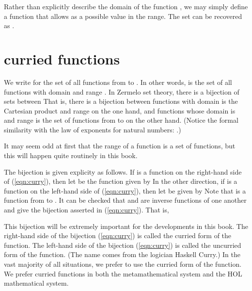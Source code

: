 \documentclass[cup9a]{cupbook}
\begin{document}
Rather than explicitly describe the domain of the function , we may simply
define a function  that allows  as a possible value in the range.  The set  can be recovered as
.







\section{curried functions}

We write  for the set of all functions from  to .  In other
words,  is the set of all functions with domain  and range .
In Zermelo set theory, there is a bijection of sets between
That is, there is a bijection between functions with domain is the Cartesian product  and range  on the one hand, and functions whose domain is  and range is the set of functions from  to  on the other hand.
(Notice the formal similarity with the law of exponents for natural numbers:
.)

It may seem odd at first that the range of a function is a set of functions, but this will happen quite routinely in this book.

The bijection is given explicity as follows.  If  is a function
on the right-hand side of (\ref{eqn:curry}), then let 
be the function given by 
In the other direction, if  is a function on the left-hand side of (\ref{eqn:curry}), then let  be given by
Note that  is a function from  to .
It can be  checked that  and  are inverse functions of one another and give the bijection asserted in (\ref{eqn:curry}).
That is,

This bijection will be extremely important for the developments in this book.  The right-hand side of the bijection (\ref{eqn:curry}) is called the curried form of the function.  The left-hand side of the bijection (\ref{eqn:curry}) is called the uncurried form of the function.  (The name comes from the logician Haskell Curry.)   In the vast majority of all situations, we prefer to use the curried form of the function.  We prefer curried functions in both the metamathematical system and the HOL mathematical system.
\end{document}
